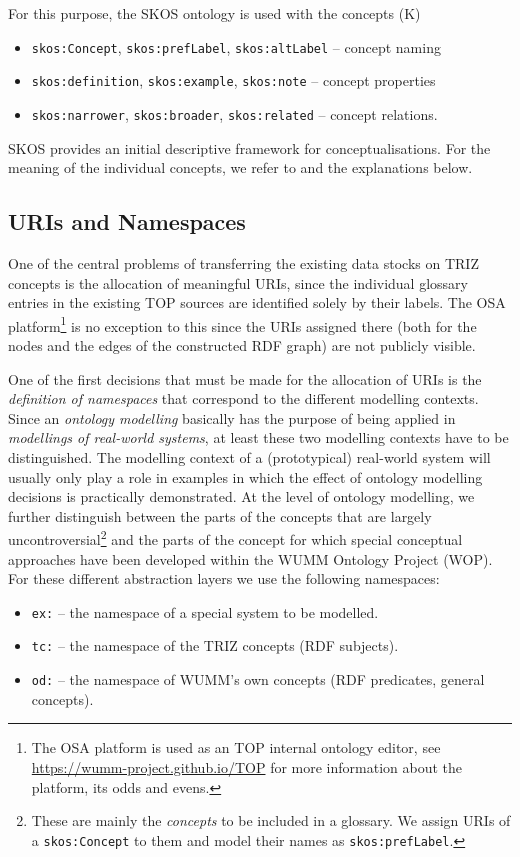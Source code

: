 \documentclass[11pt,a4paper]{article}
\begin{document}
For this purpose, the SKOS ontology \cite{SKOS} is used with the concepts (K)
\begin{itemize}[noitemsep]
\item \texttt{skos:Concept}, \texttt{skos:prefLabel}, \texttt{skos:altLabel}
  -- concept naming
\item \texttt{skos:definition}, \texttt{skos:example}, \texttt{skos:note} --
  concept properties
\item \texttt{skos:narrower}, \texttt{skos:broader}, \texttt{skos:related} --
  concept relations.
\end{itemize}
SKOS provides an initial descriptive framework for conceptualisations.  For
the meaning of the individual concepts, we refer to \cite{SKOS} and the
explanations below.

\subsection{URIs and Namespaces}

One of the central problems of transferring the existing data stocks on TRIZ
concepts is the allocation of meaningful URIs, since the individual glossary
entries in the existing TOP sources are identified solely by their labels.
The OSA platform\footnote{The OSA platform is used as an TOP internal ontology
  editor, see \url{https://wumm-project.github.io/TOP} for more information
  about the platform, its odds and evens.} is no exception to this since the
URIs assigned there (both for the nodes and the edges of the constructed RDF
graph) are not publicly visible.

One of the first decisions that must be made for the allocation of URIs is the
\emph{definition of namespaces} that correspond to the different modelling
contexts. Since an \emph{ontology modelling} basically has the purpose of
being applied in \emph{modellings of real-world systems}, at least these two
modelling contexts have to be distinguished. The modelling context of a
(prototypical) real-world system will usually only play a role in examples in
which the effect of ontology modelling decisions is practically demonstrated.
At the level of ontology modelling, we further distinguish between the parts
of the concepts that are largely uncontroversial\footnote{These are mainly the
  \emph{concepts} to be included in a glossary. We assign URIs of a
  \texttt{skos:Concept} to them and model their names as
  \texttt{skos:prefLabel}.} and the parts of the concept for which special
conceptual approaches have been developed within the WUMM Ontology Project
(WOP).  For these different abstraction layers we use the following
namespaces:
\begin{itemize}[noitemsep]
\item \texttt{ex:} -- the namespace of a special system to be modelled. 
\item \texttt{tc:} -- the namespace of the TRIZ concepts (RDF subjects).
\item \texttt{od:} -- the namespace of WUMM's own concepts (RDF predicates,
  general concepts). 
\end{itemize}
\end{document}

